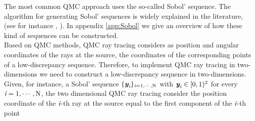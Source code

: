 The most common QMC approach uses the so-called Sobol' sequence. The algorithm for generating Sobol' sequences is widely explained in the literature, (see for instance , \cite{bratley1988algorithm}). In appendix \ref{app:Sobol} we give an overview of how these kind of sequences can be constructed.
\\ \indent Based on QMC methods, QMC ray tracing considers as position and angular coordinates of the rays at the source, the coordinates of the corresponding points of a low-discrepancy sequence. 
Therefore, to implement QMC ray tracing in two-dimensions we need to construct a low-discrepancy sequence in two-dimensions.  
Given, for instance, a Sobol' sequence $\{\textit{\textbf{y}}_{\textit{i}}\}_{\textit{i}=1, \cdots, \textrm{N}}$ with $\textit{\textbf{y}}_{\textit{i}}\in[0,1)^2$ for every $\textit{i}=1, \cdots, \textrm{N}$, the two dimensional QMC ray tracing consider the position coordinate of the $\textit{i}$-th ray at the source equal to the first component of the $\textit{i}$-th point 
